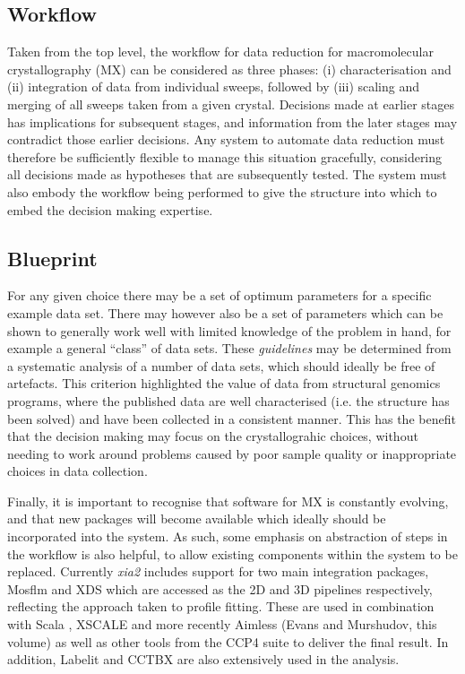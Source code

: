 \documentclass[preprint,pdf]{iucr}
\begin{document}
\subsection{Workflow}

Taken from the top level, the workflow for data reduction for
macromolecular crystallography (MX) can be considered as three phases:
(i) characterisation and (ii) integration of data from individual sweeps,
followed by (iii) scaling and merging of all sweeps taken from a given
crystal. Decisions made at earlier stages has implications for
subsequent stages, and information from the later stages may
contradict those earlier decisions. Any system to automate data
reduction must therefore be sufficiently flexible to manage this
situation gracefully, considering all decisions made as hypotheses
that are subsequently tested. The system must also embody the workflow being
performed to give the structure into which to embed the decision
making expertise.

\subsection{Blueprint}

For any given choice there may be a set of optimum parameters for a
specific example data set. There may however also be a set of
parameters which can be 
shown to generally work well with limited knowledge of the problem in
hand, for example a general ``class'' of data sets.
These \emph{guidelines} may be determined from a systematic
analysis of a number of data sets, which should ideally be free of
artefacts. This criterion highlighted the value of data from 
structural genomics programs, where the published data are well
characterised (i.e. the structure has been solved) and have been
collected in a consistent manner. This has the benefit that the
decision making may focus on the crystallograhic choices, without
needing to work around problems caused by poor sample quality or
inappropriate choices in data collection. 

Finally, it is important to recognise that software for MX is
constantly evolving, and that new packages will become available which
ideally should be incorporated into the system. As such, some emphasis
on abstraction of steps in the workflow is also helpful, to allow
existing components within the system to be replaced. Currently \emph{xia2} 
includes support for two main integration packages, Mosflm
\cite{leslie1992rcm} and XDS \cite{Kabsch:dz5179}
which are accessed as the 2D and 3D
pipelines respectively, reflecting the approach taken to profile
fitting. These are used in combination with Scala \cite{Evans:ba5084}, XSCALE
and more recently Aimless (Evans and Murshudov, this volume) as well
as other
tools from the CCP4 suite to deliver the final result. In
addition, Labelit \cite{Sauter:dd5008} and CCTBX
\cite{Grosse-Kunstleve:ks0118} are also 
extensively used in the analysis.
\end{document}
